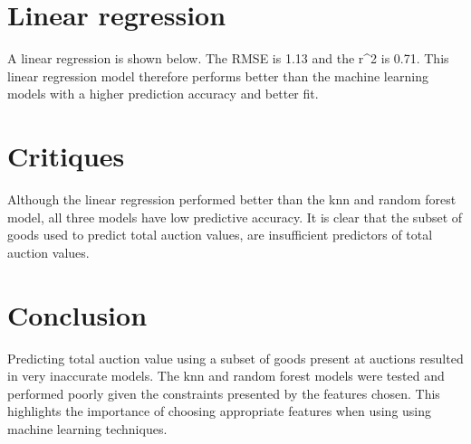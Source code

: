 \documentclass[11pt,preprint, authoryear]{elsarticle}
\numberwithin{equation}{section}
\numberwithin{figure}{section}
\numberwithin{table}{section}
\begin{document}
\hypertarget{linear-regression}{%
\section{Linear regression}\label{linear-regression}}

A linear regression is shown below. The RMSE is 1.13 and the r\^{}2 is
0.71. This linear regression model therefore performs better than the
machine learning models with a higher prediction accuracy and better
fit.

\hypertarget{critiques}{%
\section{Critiques}\label{critiques}}

Although the linear regression performed better than the knn and random
forest model, all three models have low predictive accuracy. It is clear
that the subset of goods used to predict total auction values, are
insufficient predictors of total auction values.

\hypertarget{conclusion}{%
\section{Conclusion}\label{conclusion}}

Predicting total auction value using a subset of goods present at
auctions resulted in very inaccurate models. The knn and random forest
models were tested and performed poorly given the constraints presented
by the features chosen. This highlights the importance of choosing
appropriate features when using using machine learning techniques.


\end{document}
